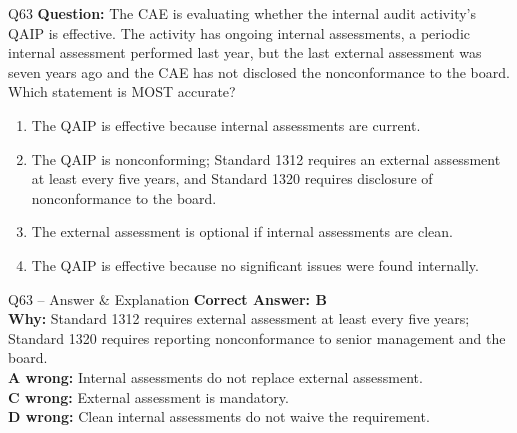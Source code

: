 \documentclass[aspectratio=169,10pt]{beamer}
\begin{document}
	\begin{frame}[t]{Q63}
		\small
		\textbf{Question:} The CAE is evaluating whether the internal audit activity's QAIP is effective. The activity has ongoing internal assessments, a periodic internal assessment performed last year, but the last external assessment was seven years ago and the CAE has not disclosed the nonconformance to the board. Which statement is MOST accurate?
		\begin{enumerate}[label=\Alph*.,itemsep=1pt,topsep=2pt]
			\item The QAIP is effective because internal assessments are current.
			\item The QAIP is nonconforming; Standard 1312 requires an external assessment at least every five years, and Standard 1320 requires disclosure of nonconformance to the board.
			\item The external assessment is optional if internal assessments are clean.
			\item The QAIP is effective because no significant issues were found internally.
		\end{enumerate}
	\end{frame}
	
	\begin{frame}[t]{Q63 -- Answer \& Explanation}
		\small
		\textbf{Correct Answer: B} \\[4pt]
		\textbf{Why:} Standard 1312 requires external assessment at least every five years; Standard 1320 requires reporting nonconformance to senior management and the board. \\[4pt]
		\textbf{A wrong:} Internal assessments do not replace external assessment. \\[2pt]
		\textbf{C wrong:} External assessment is mandatory. \\[2pt]
		\textbf{D wrong:} Clean internal assessments do not waive the requirement.
	\end{frame}
	
\end{document}
